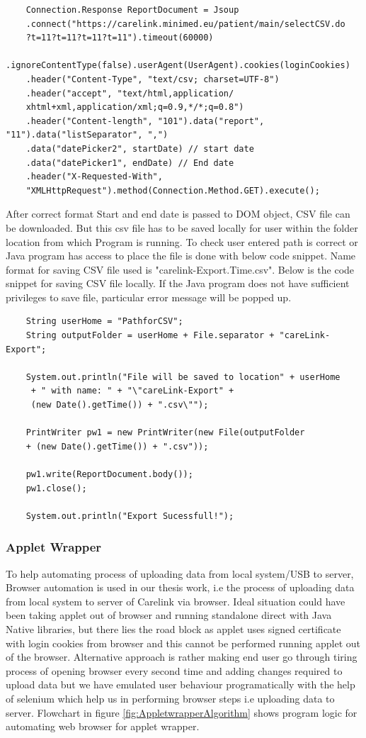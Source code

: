 \documentclass[article,type=msc,colorback,accentcolor=tud9c,twoside,11pt]{tudthesis}
\begin{document}
	\begin{lstlisting}
	Connection.Response ReportDocument = Jsoup
	.connect("https://carelink.minimed.eu/patient/main/selectCSV.do
	?t=11?t=11?t=11?t=11").timeout(60000)
	.ignoreContentType(false).userAgent(UserAgent).cookies(loginCookies)
	.header("Content-Type", "text/csv; charset=UTF-8")
	.header("accept", "text/html,application/
	xhtml+xml,application/xml;q=0.9,*/*;q=0.8")
	.header("Content-length", "101").data("report", "11").data("listSeparator", ",")
	.data("datePicker2", startDate) // start date
	.data("datePicker1", endDate) // End date
	.header("X-Requested-With",
	"XMLHttpRequest").method(Connection.Method.GET).execute();
	\end{lstlisting}
	After correct  format Start and end date is passed to DOM object, CSV file can be downloaded. But this csv file has to be saved locally for user within the folder location from which Program is running. To check user entered path is correct or Java program has access to place the file is done with below code snippet. Name format for saving CSV file used is "carelink-Export.Time.csv". Below is the code snippet for saving CSV file locally. If the Java program does not have sufficient privileges to save file, particular error message will be popped up.
	\begin{lstlisting}
	String userHome = "PathforCSV";
	String outputFolder = userHome + File.separator + "careLink-Export";
	
	System.out.println("File will be saved to location" + userHome
	 + " with name: " + "\"careLink-Export" + 
	 (new Date().getTime()) + ".csv\"");
	
	PrintWriter pw1 = new PrintWriter(new File(outputFolder
	+ (new Date().getTime()) + ".csv"));
	
	pw1.write(ReportDocument.body());
	pw1.close();
	
	System.out.println("Export Sucessfull!");
	\end{lstlisting}
	
	\subsubsection{Applet Wrapper}
	\label{subsec:AppletWrapper}
	To help automating process of uploading data from local system/USB to server, Browser automation is used in our thesis work, i.e the process of uploading data from local system to server of Carelink via browser. Ideal situation could have been taking applet out of browser and running standalone direct with Java Native libraries, but there lies the road block as applet uses signed certificate with login cookies from browser and this cannot be performed running applet out of the browser. Alternative approach is rather making end user go through tiring process of opening browser every second time and adding changes required to upload data but we have emulated user behaviour programatically with the help of selenium which help us in performing browser steps i.e uploading data to server. Flowchart in figure \ref{fig:AppletwrapperAlgorithm} shows  program logic for automating web browser for applet wrapper.
	
\end{document}
